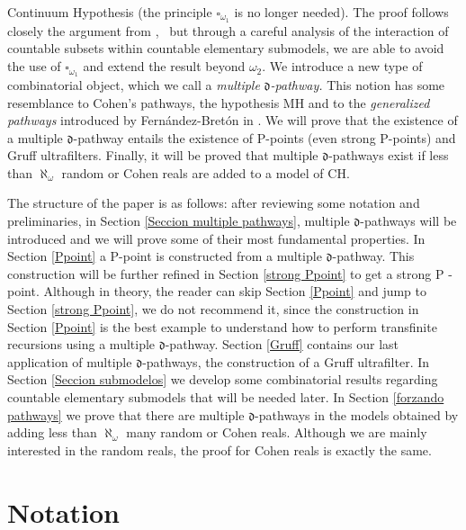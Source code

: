 \documentclass{article}%
\begin{document}
Continuum Hypothesis (the principle \textsf{ }$\square_{\omega_{1}}$ is no
longer needed). The proof follows closely the argument from
\cite{PFiltersCohenRandomLaver}, \ but through a careful analysis of the
interaction of countable subsets within countable elementary submodels, we are
able to avoid the use of $\square_{\omega_{1}}$ and extend the result beyond
$\omega_{2}.$ We introduce a new type of combinatorial object, which we call a
\emph{multiple} $\mathfrak{d}$\emph{-pathway. }This notion has some
resemblance to Cohen's pathways, the hypothesis \textsf{MH} and to the
\emph{generalized pathways }introduced by Fern\'{a}ndez-Bret\'{o}n in
\cite{GeneralizedPathways}. We will prove that the existence of a multiple
$\mathfrak{d}$-pathway entails the existence of \textsf{P}-points (even strong
\textsf{P}-points) and Gruff ultrafilters. Finally, it will be proved that
multiple $\mathfrak{d}$-pathways exist if less than $\aleph_{\omega}$ random
or Cohen reals are added to a model of \textsf{CH.}

\qquad\qquad\qquad

The structure of the paper is as follows: after reviewing some notation and
preliminaries, in Section \ref{Seccion multiple pathways}, multiple
$\mathfrak{d}$-pathways will be introduced and we will prove some of their
most fundamental properties. In Section \ref{Ppoint} a \textsf{P}-point is
constructed from a multiple $\mathfrak{d}$-pathway. This construction will be
further refined in Section \ref{strong Ppoint} to get a strong \textsf{P}%
-point. Although in theory, the reader can skip Section \ref{Ppoint} and jump
to Section \ref{strong Ppoint}, we do not recommend it, since the construction
in Section \ref{Ppoint} is the best example to understand how to perform
transfinite recursions using a multiple $\mathfrak{d}$-pathway. Section
\ref{Gruff} contains our last application of multiple $\mathfrak{d}$-pathways,
the construction of a Gruff ultrafilter. In Section \ref{Seccion submodelos}
we develop some combinatorial results regarding countable elementary submodels
that will be needed later. In Section \ref{forzando pathways} we prove that
there are multiple $\mathfrak{d}$-pathways in the models obtained by adding
less than $\aleph_{\omega}$ many random or Cohen reals. Although we are mainly
interested in the random reals, the proof for Cohen reals is exactly the same.

\section{Notation}
\end{document}
